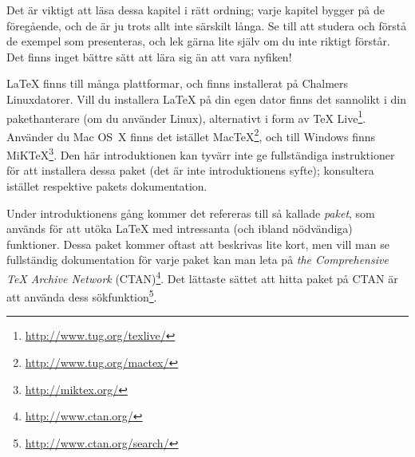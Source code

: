 \documentclass[10pt,../../a4.tex]{subfiles}
\begin{document}
Det är viktigt att läsa dessa kapitel i rätt ordning; varje kapitel bygger på de
föregående, och de är ju trots allt inte särskilt långa. Se till att
studera och förstå de exempel som presenteras, och lek gärna lite själv
om du inte riktigt förstår. Det finns inget bättre sätt att lära sig än
att vara nyfiken!

\LaTeX{} finns till många plattformar, och finns installerat på Chalmers
Linux\-da\-to\-rer. Vill du installera \LaTeX{} på din egen dator finns det
sannolikt i din pakethanterare (om du använder Linux), alternativt i form
av \TeX{} Live\footnote{\url{http://www.tug.org/texlive/}}. Använder du
Mac OS~X finns det istället
Mac\TeX\footnote{\url{http://www.tug.org/mactex/}}, och till Windows finns
MiK\TeX\footnote{\url{http://miktex.org/}}. Den här introduktionen kan
tyvärr inte ge fullständiga instruktioner för att installera dessa paket
(det är inte introduktionens syfte);
konsultera istället respektive pakets dokumentation.

Under introduktionens gång kommer det refereras till så kallade
\emph{paket}, som används för att utöka \LaTeX{} med intressanta (och
ibland nödvändiga) funktioner. Dessa paket kommer oftast att beskrivas
lite kort, men vill man se fullständig dokumentation för varje paket
kan man leta på \emph{the Comprehensive \TeX{} Archive Network}
(CTAN)\footnote{\url{http://www.ctan.org/}\label{sec:ctan}}.
Det lättaste sättet att hitta paket på CTAN är att använda dess
sökfunktion\footnote{\url{http://www.ctan.org/search/}}.
\end{document}
